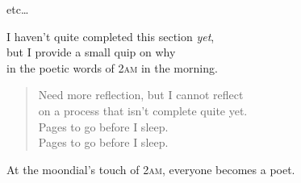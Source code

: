 etc\dots



\begin{draftvspace}{1in}
  I haven't quite completed this section \emph{yet}, \\
    but I provide a small quip on why \\
    in the poetic words of 2\textsc{am} in the morning.
  \begin{verse}
    Need more reflection, but I cannot reflect \\
    on a process that isn't complete quite yet. \\
    Pages to go before I sleep. \\
    Pages to go before I sleep. \\
  \end{verse}

  \begin{displayquote}[Plato]
    At the moondial's touch of 2\textsc{am}, everyone becomes a poet.
  \end{displayquote}
\end{draftvspace}

